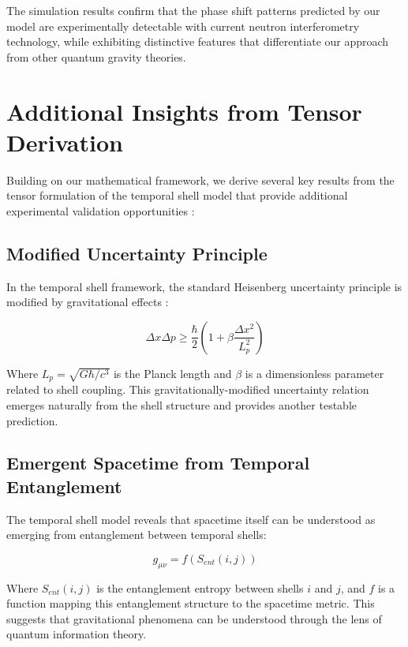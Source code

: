 \documentclass[12pt,a4paper]{article}
\begin{document}
The simulation results confirm that the phase shift patterns predicted by our model are experimentally detectable with current neutron interferometry technology, while exhibiting distinctive features that differentiate our approach from other quantum gravity theories.

\section{Additional Insights from Tensor Derivation}

Building on our mathematical framework, we derive several key results from the tensor formulation of the temporal shell model that provide additional experimental validation opportunities \citep{thooft}:

\subsection{Modified Uncertainty Principle}

In the temporal shell framework, the standard Heisenberg uncertainty principle is modified by gravitational effects \citep{hawking1992}:

\begin{equation}
\Delta x \Delta p \geq \frac{\hbar}{2} \left(1 + \beta \frac{\Delta x^2}{L_p^2}\right)
\end{equation}

Where $L_p = \sqrt{G\hbar/c^3}$ is the Planck length and $\beta$ is a dimensionless parameter related to shell coupling. This gravitationally-modified uncertainty relation emerges naturally from the shell structure and provides another testable prediction.

\subsection{Emergent Spacetime from Temporal Entanglement}

The temporal shell model reveals that spacetime itself can be understood as emerging from entanglement between temporal shells:

\begin{equation}
g_{\mu\nu} = f(S_{ent}(i,j))
\end{equation}

Where $S_{ent}(i,j)$ is the entanglement entropy between shells $i$ and $j$, and $f$ is a function mapping this entanglement structure to the spacetime metric. This suggests that gravitational phenomena can be understood through the lens of quantum information theory.
\end{document}
